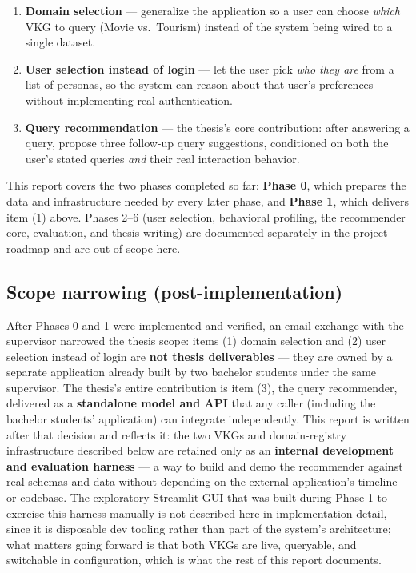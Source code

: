 \documentclass[11pt,a4paper]{article}
\begin{document}
\begin{enumerate}[label=(\arabic*)]
    \item \textbf{Domain selection} --- generalize the application so a user can choose
        \emph{which} VKG to query (Movie vs.\ Tourism) instead of the system being wired to a
        single dataset.
    \item \textbf{User selection instead of login} --- let the user pick \emph{who they are}
        from a list of personas, so the system can reason about that user's preferences without
        implementing real authentication.
    \item \textbf{Query recommendation} --- the thesis's core contribution: after answering a
        query, propose three follow-up query suggestions, conditioned on both the user's stated
        queries \emph{and} their real interaction behavior.
    \end{enumerate}

This report covers the two phases completed so far: \textbf{Phase 0}, which prepares the data
and infrastructure needed by every later phase, and \textbf{Phase 1}, which delivers item (1)
above. Phases 2--6 (user selection, behavioral profiling, the recommender core, evaluation, and
thesis writing) are documented separately in the project roadmap and are out of scope here.

\subsection{Scope narrowing (post-implementation)}
\label{sec:scope}

After Phases 0 and 1 were implemented and verified, an email exchange with the supervisor
narrowed the thesis scope: items (1) domain selection and (2) user selection instead of login are
\textbf{not thesis deliverables} --- they are owned by a separate application already built by
two bachelor students under the same supervisor. The thesis's entire contribution is item (3),
the query recommender, delivered as a \textbf{standalone model and API} that any caller
(including the bachelor students' application) can integrate independently. This report is
written after that decision and reflects it: the two VKGs and domain-registry infrastructure
described below are retained only as an \textbf{internal development and evaluation harness} ---
a way to build and demo the recommender against real schemas and data without depending on the
external application's timeline or codebase. The exploratory Streamlit GUI that was built during
Phase 1 to exercise this harness manually is not described here in implementation detail, since
it is disposable dev tooling rather than part of the system's architecture; what matters going
forward is that both VKGs are live, queryable, and switchable in configuration, which is what the
rest of this report documents.
\end{document}
